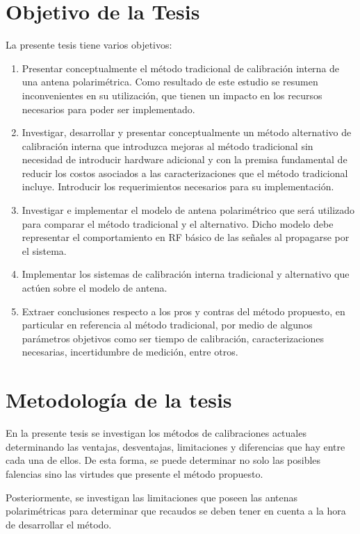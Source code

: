 \section{Objetivo de la Tesis} \label{sc:objective}

La presente tesis tiene varios objetivos:

\begin{enumerate}
    \item Presentar conceptualmente el método tradicional de calibración interna de una antena polarimétrica. Como resultado
		de este estudio se resumen inconvenientes en su utilización, que tienen un impacto en los recursos necesarios para poder ser
		implementado.
	\item Investigar, desarrollar y presentar conceptualmente un método alternativo de calibración interna que introduzca
		mejoras al método tradicional sin necesidad de introducir hardware adicional y con la premisa fundamental de
		reducir los costos asociados a las caracterizaciones que el método tradicional incluye. Introducir los
		requerimientos necesarios para su implementación.
    \item Investigar e implementar el modelo de antena polarimétrico que será utilizado para comparar el método tradicional y el
		alternativo. Dicho modelo debe representar el comportamiento en RF básico de las señales al propagarse por el sistema.
    \item Implementar los sistemas de calibración interna tradicional y alternativo que actúen sobre el modelo de antena. 
    \item Extraer conclusiones respecto a los pros y contras del método propuesto, en particular en referencia al método
		tradicional, por medio de algunos parámetros objetivos como ser tiempo de calibración, caracterizaciones necesarias,
		incertidumbre de medición, entre otros.
\end{enumerate}


\section{Metodología de la tesis} \label{sc:methodology}

En la presente tesis se investigan los métodos de calibraciones actuales determinando las ventajas, desventajas, limitaciones
y diferencias que hay entre cada una de ellos. De esta forma, se puede determinar no solo las posibles falencias sino las 
virtudes que presente el método propuesto.

Posteriormente, se investigan las limitaciones que poseen las antenas polarimétricas para determinar que recaudos
se deben tener en cuenta a la hora de desarrollar el método.

